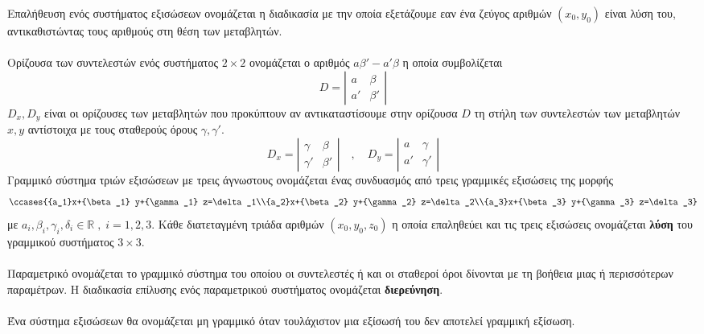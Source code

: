 \documentclass[twoside,nofonts,internet,shmeiwseis]{thewria}
\begin{document}
Επαλήθευση ενός συστήματος εξισώσεων ονομάζεται η διαδικασία με την οποία εξετάζουμε εαν ένα ζεύγος αριθμών $ \left(x_0,y_0\right)  $ είναι λύση του, αντικαθιστώντας τους αριθμούς στη θέση των μεταβλητών.\\\\
Ορίζουσα των συντελεστών ενός συστήματος $ 2\times2 $ ονομάζεται ο αριθμός $ a\beta'-a'\beta $ η οποία συμβολίζεται
\[ D=\left|\begin{array}{cc}
a & \beta \\ 
a' & \beta'
\end{array}  \right|  \]
$ D_x,D_y $ είναι οι ορίζουσες των μεταβλητών που προκύπτουν αν αντικαταστίσουμε στην ορίζουσα $ D $ τη στήλη των συντελεστών των μεταβλητών $ x,y $ αντίστοιχα με τους σταθερούς όρους $ \gamma,\gamma' $.
\[ D_x=\left|\begin{array}{cc}
\gamma & \beta \\ 
\gamma' & \beta'
\end{array}  \right|\quad,\quad D_y=\left|\begin{array}{cc}
a & \gamma \\ 
a' & \gamma'
\end{array}  \right| \]
Γραμμικό σύστημα τριών εξισώσεων με τρεις άγνωστους ονομάζεται ένας συνδυασμός από τρεις γραμμικές εξισώσεις της μορφής
\[ \ccases{{a_1}x+{\beta_1} y+{\gamma_1} z=\delta_1\\{a_2}x+{\beta_2} y+{\gamma_2} z=\delta_2\\{a_3}x+{\beta_3} y+{\gamma_3} z=\delta_3} \]
με $ a_i,\beta_i,\gamma_i,\delta_i\in\mathbb{R}\;,\;i=1,2,3 $. Κάθε διατεταγμένη τριάδα αριθμών $ \left( x_0,y_0,z_0\right)  $ η οποία επαληθεύει και τις τρεις εξισώσεις ονομάζεται \textbf{λύση} του γραμμικού συστήματος $ 3\times3 $.\\\\
Παραμετρικό ονομάζεται το γραμμικό σύστημα του οποίου οι συντελεστές ή και οι σταθεροί όροι δίνονται με τη βοήθεια μιας ή περισσότερων παραμέτρων. Η διαδικασία επίλυσης ενός παραμετρικού συστήματος ονομάζεται \textbf{διερεύνηση}.
\\\\
Ένα σύστημα εξισώσεων θα ονομάζεται μη γραμμικό όταν τουλάχιστον μια εξίσωσή του δεν αποτελεί γραμμική εξίσωση.\\\\
\end{document}
